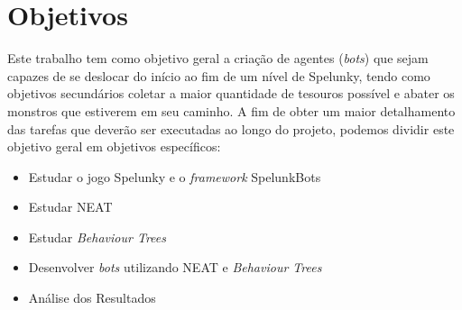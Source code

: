 \chapter{\label{chap:objectives}Objetivos}

Este trabalho tem como objetivo geral a criação de agentes (\textit{bots}) que
sejam capazes de se deslocar do início ao fim de um nível de Spelunky, tendo
como objetivos secundários coletar a maior quantidade de tesouros possível e
abater os monstros que estiverem em seu caminho. A fim de obter um maior
detalhamento das tarefas que deverão ser executadas ao longo do projeto,
podemos dividir este objetivo geral em objetivos específicos:

\begin{itemize}
    \item
        Estudar o jogo Spelunky e o \textit{framework} SpelunkBots
    \item
        Estudar NEAT
    \item
        Estudar \textit{Behaviour Trees}
    \item
        Desenvolver \textit{bots} utilizando NEAT e \textit{Behaviour Trees}
    \item
        Análise dos Resultados
\end{itemize}
